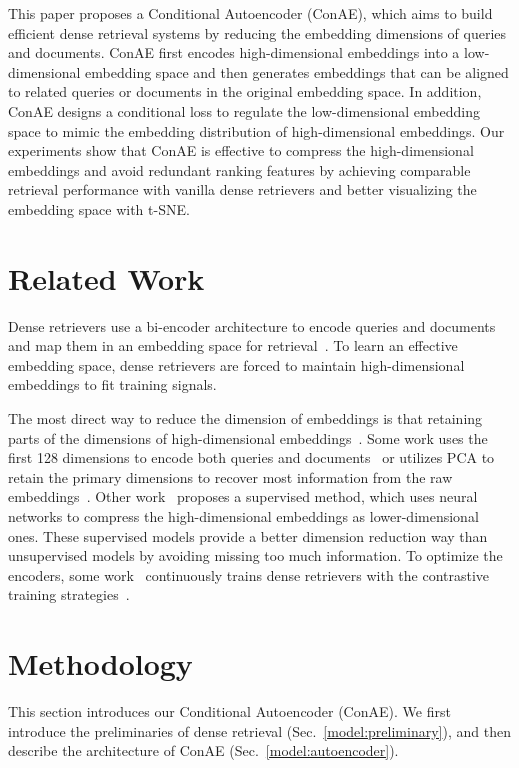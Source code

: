 \documentclass[11pt]{article}
\begin{document}
This paper proposes a Conditional Autoencoder (ConAE), which aims to build efficient dense retrieval systems by reducing the embedding dimensions of queries and documents. ConAE first encodes high-dimensional embeddings into a low-dimensional embedding space and then generates embeddings that can be aligned to related queries or documents in the original embedding space. In addition, ConAE designs a conditional loss to regulate the low-dimensional embedding space to mimic the embedding distribution of high-dimensional embeddings. Our experiments show that ConAE is effective to compress the high-dimensional embeddings and avoid redundant ranking features by achieving comparable retrieval performance with vanilla dense retrievers and better visualizing the embedding space with t-SNE. \section{Related Work}
Dense retrievers use a bi-encoder architecture to encode queries and documents and map them in an embedding space for retrieval~\cite{karpukhin2020dense,xiong2020dense,xiong2020approximate,lewis2020pre,zhan2020learning,li2021more,Yu2021FewShotCD}. To learn an effective embedding space, dense retrievers are forced to maintain high-dimensional embeddings to fit training signals. 

The most direct way to reduce the dimension of embeddings is that retaining parts of the dimensions of high-dimensional embeddings~\cite{yang2021designing,ma2021simple}. Some work uses the first 128 dimensions to encode both queries and documents~\cite{yang2021designing} or utilizes PCA to retain the primary dimensions to recover most information from the raw embeddings~\cite{ma2021simple}. Other work~\cite{ma2021simple} proposes a supervised method, which uses neural networks to compress the high-dimensional embeddings as lower-dimensional ones. These supervised models provide a better dimension reduction way than unsupervised models by avoiding missing too much information. To optimize the encoders, some work~\cite{ma2021simple} continuously trains dense retrievers with the contrastive training strategies~\cite{karpukhin2020dense,xiong2020approximate}. \section{Methodology}
This section introduces our Conditional Autoencoder (ConAE). We first introduce the preliminaries of dense retrieval (Sec.~\ref{model:preliminary}), and then describe the architecture of ConAE (Sec.~\ref{model:autoencoder}).
\end{document}
